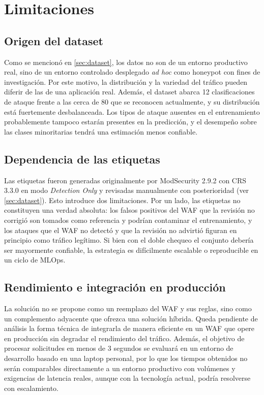\documentclass[12pt, a4paper]{article}
\begin{document}
\section{Limitaciones}

\subsection{Origen del dataset}

Como se mencionó en \ref{sec:dataset}, los datos no son de un entorno productivo real, sino de un entorno controlado desplegado \textit{ad hoc} como honeypot con fines de investigación. Por este motivo, la distribución y la variedad del tráfico pueden diferir de las de una aplicación real. Además, el dataset abarca 12 clasificaciones de ataque frente a las cerca de 80 que se reconocen actualmente, y su distribución está fuertemente desbalanceada. Los tipos de ataque ausentes en el entrenamiento probablemente tampoco estarán presentes en la predicción, y el desempeño sobre las clases minoritarias tendrá una estimación menos confiable.

\subsection{Dependencia de las etiquetas}

Las etiquetas fueron generadas originalmente por ModSecurity 2.9.2 con CRS 3.3.0 en modo \textit{Detection Only} y revisadas manualmente con posterioridad (ver \ref{sec:dataset}). Esto introduce dos limitaciones. Por un lado, las etiquetas no constituyen una verdad absoluta: los falsos positivos del WAF que la revisión no corrigió son tomados como referencia y podrían contaminar el entrenamiento, y los ataques que el WAF no detectó y que la revisión no advirtió figuran en principio como tráfico legítimo. Si bien con el doble chequeo el conjunto debería ser mayormente confiable, la estrategia es difícilmente escalable o reproducible en un ciclo de MLOps.



\subsection{Rendimiento e integración en producción}

La solución no se propone como un reemplazo del WAF y sus reglas, sino como un complemento adyacente que ofrezca una solución híbrida. Queda pendiente de análisis la forma técnica de integrarla de manera eficiente en un WAF que opere en producción sin degradar el rendimiento del tráfico. Además, el objetivo de procesar solicitudes en menos de 3 segundos se evaluará en un entorno de desarrollo basado en una laptop personal, por lo que los tiempos obtenidos no serán comparables directamente a un entorno productivo con volúmenes y exigencias de latencia reales, aunque con la tecnología actual, podría resolverse con escalamiento.



\end{document}
